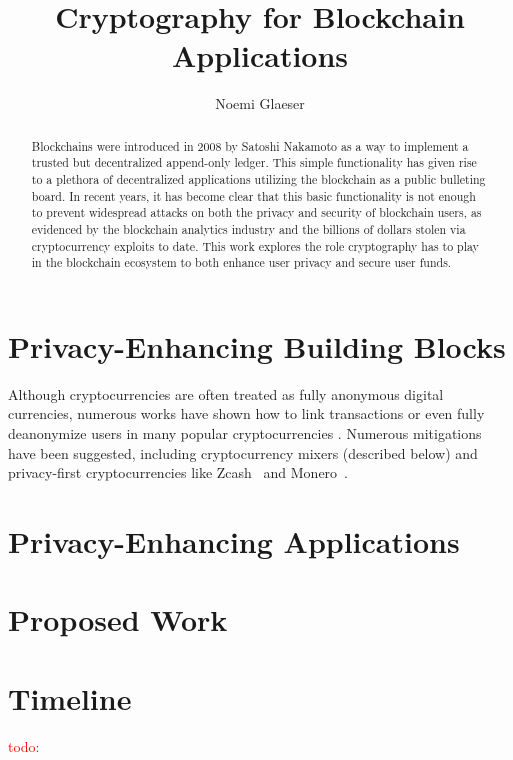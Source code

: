 \documentclass{article}
\title{Cryptography for Blockchain Applications}
\author{Noemi Glaeser}
\date{}
\newcommand{\noemi}[1]{\textcolor{magenta}{Noemi: #1}}
\newcommand{\todo}[1]{\textcolor{red}{todo: #1}}
\begin{document}
\maketitle
\begin{abstract}
Blockchains were introduced in 2008 by Satoshi Nakamoto as a way to implement a trusted but decentralized append-only ledger. This simple functionality has given rise to a plethora of decentralized applications utilizing the blockchain as a public bulleting board. In recent years, it has become clear that this basic functionality is not enough to prevent widespread attacks on both the privacy and security of blockchain users, as evidenced by the blockchain analytics industry and the billions of dollars stolen via cryptocurrency exploits to date. This work explores the role cryptography has to play in the blockchain ecosystem to both enhance user privacy and secure user funds.

\end{abstract}

\tableofcontents



\section{Privacy-Enhancing Building Blocks}\label{sec:building-blocks}

Although cryptocurrencies are often treated as fully anonymous digital currencies, numerous works have shown how to link transactions or even fully deanonymize users in many popular cryptocurrencies \cite{CCS:BirKhoPus14,EuroSP:BirTik19,FC:KosKosMcD14,PoPETS:MSHLHSHHMNC18,USENIX:KYMM18}. Numerous mitigations have been suggested, including cryptocurrency mixers (described below) and privacy-first cryptocurrencies like Zcash~\cite{zcash} and Monero~\cite{monero}. 



\section{Privacy-Enhancing Applications}\label{sec:applications}




\section{Proposed Work}\label{sec:proposed}



\section{Timeline}
\todo{}

{\small


}
\end{document}
